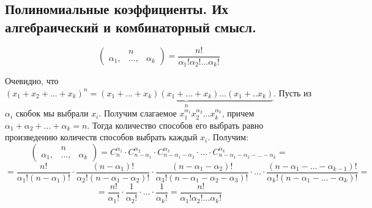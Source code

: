 \subsection{Полиномиальные коэффициенты. Их алгебраический и комбинаторный смысл.}

$$\begin{pmatrix}&n\\\alpha_1,&...,&\alpha_k\end{pmatrix} = \frac{n!}{\alpha_1!\alpha_2!...\alpha_k!}$$

Очевидно, что $(x_1 + x_2 + ... + x_k)^n = \underbrace{(x_1 + ... + x_k)(x_1 + ... + x_k)...(x_1 + .. x_k)}_{n}$. Пусть из $\alpha_i$ скобок мы выбрали $x_i$. Получим слагаемое $x_1^{\alpha_1}x_2^{\alpha_2}...x_k^{\alpha_k}$, причем $\alpha_1 + \alpha_2 + ... + \alpha_k = n$. Тогда количество способов его выбрать равно произведению количеств способов выбрать каждый $x_i$. Получим:
$$\begin{pmatrix}&n\\\alpha_1,&...,&\alpha_k\end{pmatrix} = C^{\alpha_1}_{n} \cdot C^{\alpha_2}_{n - \alpha_1} \cdot C^{\alpha_3}_{n - \alpha_1 - \alpha_2} \cdot ... \cdot C^{\alpha_k}_{n - \alpha_1 - \alpha_2 - ... - \alpha_k} = $$
$$ =\frac{n!}{\alpha_1!(n-\alpha_1)!} \cdot \frac{(n - \alpha_1)!}{\alpha_2!(n-\alpha_1-\alpha_2)!} \cdot \frac{(n-\alpha_1-\alpha_2)!}{\alpha_3!(n-\alpha_1-\alpha_2-\alpha_3)!} \cdot ... \cdot \frac{(n-\alpha_1-...-\alpha_{k-1})!}{\alpha_k!(n-\alpha_1-...-\alpha_k)!} = $$
$$= \frac{n!}{\alpha_1!} \cdot \frac{1}{\alpha_2!} \cdot ... \cdot \frac{1}{\alpha_k!} = \frac{n!}{\alpha_1!\alpha_2!...\alpha_k!}$$